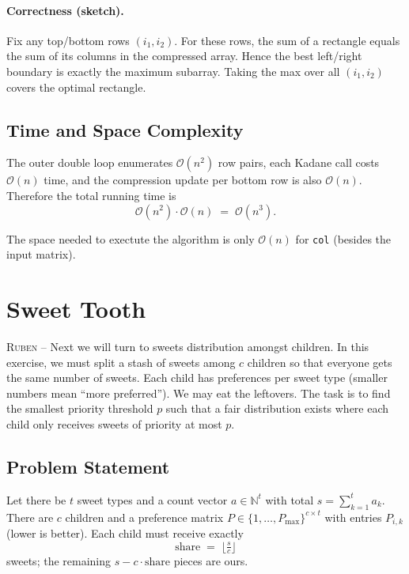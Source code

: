 \documentclass[a4paper,12pt,headsepline]{scrartcl}
\begin{document}
\paragraph{Correctness (sketch).}
Fix any top/bottom rows $(i_1,i_2)$. For these rows, the sum of a rectangle equals the sum of its columns in the compressed array. Hence the best left/right boundary is exactly the maximum subarray. Taking the max over all $(i_1,i_2)$ covers the optimal rectangle.

\subsection{Time and Space Complexity}

The outer double loop enumerates $\mathcal{O}(n^2)$ row pairs, each Kadane call costs $\mathcal{O}(n)$ time, and the compression update per bottom row is also $\mathcal{O}(n)$. Therefore the total running time is
\[
\mathcal{O}(n^2) \cdot \mathcal{O}(n) \;=\; \mathcal{O}(n^3) .
\]

The space needed to exectute the algorithm is only $\mathcal{O}(n)$ for \texttt{col} (besides the input matrix).


\section{Sweet Tooth} \label{sec:SweetTooth}
\textsc{Ruben --}
Next we will turn to sweets distribution amongst children. In this exercise, we must split a stash of sweets among $c$ children so that everyone gets the same number of sweets. Each child has preferences per sweet type (smaller numbers mean ``more preferred''). We may eat the leftovers. The task is to find the smallest priority threshold $p$ such that a fair distribution exists where each child only receives sweets of priority at most $p$. %

\subsection{Problem Statement}

Let there be $t$ sweet types and a count vector $a \in \mathbb{N}^t$ with total $s=\sum_{k=1}^t a_k$. There are $c$ children and a preference matrix $P \in \{1,\dots,P_{\max}\}^{c \times t}$ with entries $P_{i,k}$ (lower is better). Each child must receive exactly
\[
\text{share} \;=\; \big\lfloor \tfrac{s}{c} \big\rfloor
\]
sweets; the remaining $s - c \cdot \text{share}$ pieces are ours.
\end{document}
